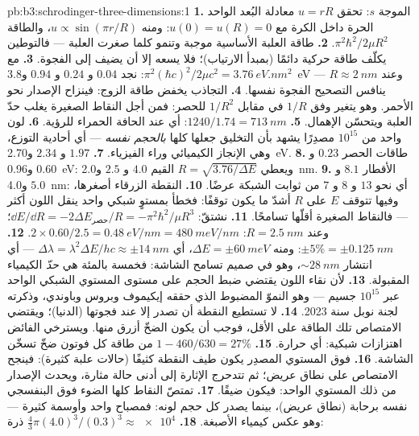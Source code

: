 \begin{solution}{pb:b3:schrodinger-three-dimensions:1}
\textbf{1.} الموجة $s$: تحقق $u = rR$ معادلة البُعد الواحد الحرة داخل
الكرة مع $u(0) = u(R) = 0$: ومنه $u \propto \sin(\pi r/R)$، والطاقة
$\pi^2\hbar^2/2\mu R^2$.
\textbf{2.} طاقة العلبة الأساسية موجبة وتنمو كلما صغرت
العلبة --- فالتوطين يكلّف طاقة حركية دائمًا
(بمبدأ الارتياب)؛ فلا يسعه إلا أن يضيف إلى الفجوة.
\textbf{3.} مع $\pi^2(\hbar c)^2/2\mu c^2 = \qty{3.76}{eV.nm^2}$:
نجد $0.04$ و $0.24$ و $0.94$ و\qty{3.8}{eV} --- وعند $R \approx \qty{2}{nm}$
ينافس التصحيح الفجوة نفسها.
\textbf{4.} التجاذب يخفض طاقة الزوج: فينزاح الإصدار
نحو الأحمر. وهو يتغير وفق $1/R$ في مقابل $1/R^2$ للحصر: فمن أجل النقاط
الصغيرة يغلب حدّ العلبة ويتحسّن الإهمال.
\textbf{5.} $1240/1.74 = \qty{713}{nm}$: أي عند الحافة الحمراء للرؤية.
\textbf{6.} لون واحد من $10^{15}$ مصدِرًا يشهد بأن
التخليق جعلها كلها \emph{بالحجم نفسه} --- أي أحادية التوزع، وهي
الإنجاز الكيميائي وراء الفيزياء.
\textbf{7.} $1.97$ و $2.34$ و\qty{2.70}{eV}.
\textbf{8.} طاقات الحصر $0.23$ و $0.60$ و\qty{0.96}{eV}: ويعطي $R =
\sqrt{3.76/\Delta E}$ القيم $4.0$ و $2.5$ و\qty{2.0}{nm}.
\textbf{9.} الأقطار $8.1$ و $5.0$ و\qty{4.0}{nm}: أي نحو $13$
و $8$ و $7$ من ثوابت الشبكة عرضًا.
\textbf{10.} النقطة الزرقاء أصغرها، وفيها تتوقف $E$ على $R$
أشدّ ما يكون توقفًا: فخطأ بمستوٍ شبكي واحد ينقل اللون أكثر ---
فالنقاط الصغيرة أقلّها تسامحًا.
\textbf{11.} نشتقّ: $\dd E/\dd R = -2\Delta E_{\text{حصر}}/R
= -\pi^2\hbar^2/\mu R^3$؛ وعند $R = \qty{2.5}{nm}$: $2 \times 0.60/2.5
= \qty{0.48}{eV/nm} = \qty{480}{meV/nm}$.
\textbf{12.} $\pm 5\% = \pm\qty{0.125}{nm}$: ومنه $\Delta E = \pm
\qty{60}{meV}$، أي $\Delta\lambda = \lambda^2\Delta E/hc \approx
\pm\qty{14}{nm}$ --- أي انتشار $\sim\qty{28}{nm}$، وهو في صميم
تسامح الشاشة: فخمسة بالمئة هي \emph{حدّ} الكيمياء
المقبولة.
\textbf{13.} لأن نقاء اللون يقتضي ضبط الحجم على مستوى
المستوي الشبكي الواحد عبر $10^{15}$ جسيم --- وهو
النموّ المضبوط الذي حققه إيكيموف وبروس وباوندي، وذكرته
لجنة نوبل سنة 2023.
\textbf{14.} لا تستطيع النقطة أن تصدر إلا عند فجوتها (الدنيا)؛ ويقتضي
الامتصاص تلك الطاقة على الأقل، فوجب أن يكون الضخّ أزرق منها. ويسترخي
الفائض اهتزازات شبكية: أي حرارة.
\textbf{15.} $1 - 460/630 = 27\%$ من طاقة كل فوتون ضخّ تسخّن
الشاشة.
\textbf{16.} فوق المستوي المصدِر يكون طيف النقطة كثيفًا
(حالات علبة كثيرة): فينجح الامتصاص على نطاق عريض؛ ثم تتدحرج
الإثارة إلى أدنى حالة مثارة، ويحدث الإصدار
من ذلك المستوي الواحد: فيكون ضيقًا.
\textbf{17.} تمتصّ النقاط كلها الضوء فوق البنفسجي نفسه برحابة
(نطاق عريض)، بينما يصدر كل حجم لونه: فمصباح واحد وأوسمة كثيرة
--- وهو عكس كيمياء الأصبغة.
\textbf{18.} $\tfrac43\pi(4.0)^3/(0.3)^3 \approx \num{e4}$ ذرة:

\end{solution}
